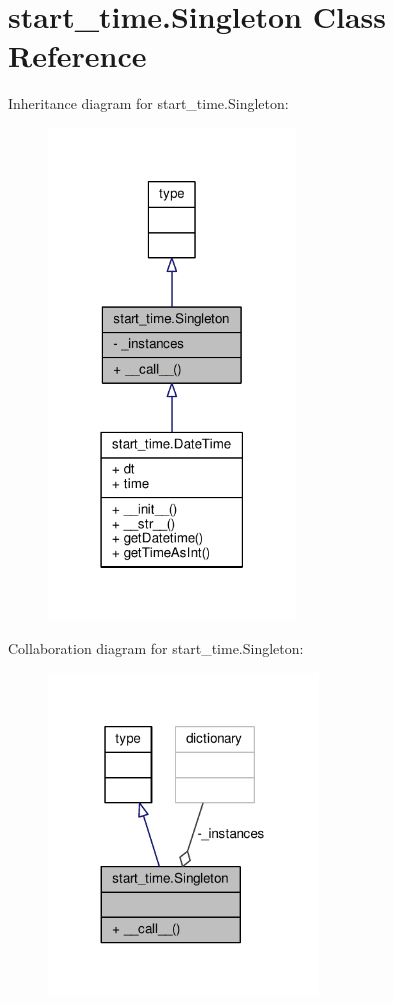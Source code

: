 \hypertarget{classstart__time_1_1_singleton}{}\section{start\+\_\+time.\+Singleton Class Reference}
\label{classstart__time_1_1_singleton}


Inheritance diagram for start\+\_\+time.\+Singleton\+:
\nopagebreak
\begin{figure}[H]
\begin{center}
\leavevmode
\includegraphics[width=186pt]{classstart__time_1_1_singleton__inherit__graph}
\end{center}
\end{figure}


Collaboration diagram for start\+\_\+time.\+Singleton\+:
\nopagebreak
\begin{figure}[H]
\begin{center}
\leavevmode
\includegraphics[width=203pt]{classstart__time_1_1_singleton__coll__graph}
\end{center}
\end{figure}

